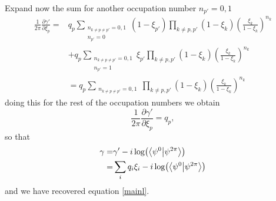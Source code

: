 \documentclass[twocolumn,amsmath,longbibliography,amssymb,superscriptaddress]{revtex4-1}
\begin{document}
Expand now the sum  for another occupation number $n_{p'} = 0,1$ 
\begin{align*}
\frac{1}{2\pi}\frac{\partial \gamma'}{\partial \xi_p} =& q_p\sum_{\substack{n_{k \neq p \neq p'}=0,1\\ n_{p'}= 0}} (1-\xi_{p'})\prod_{k\neq p,p'} (1-\xi_k)\left( \frac{\xi_k}{1-\xi_k} \right)^{n_k} \\
&+ q_p\sum_{\substack{n_{k \neq p \neq p'}=0,1\\ n_{p'}= 1}} \xi_{p'}\prod_{k\neq p,p'} (1-\xi_k)\left( \frac{\xi_k}{1-\xi_k} \right)^{n_k} \\
 &=q_p\sum_{\substack{n_{k \neq p \neq p'}=0,1}} \prod_{k\neq p,p'} (1-\xi_k)\left( \frac{\xi_k}{1-\xi_k} \right)^{n_k} 
\end{align*}
doing this for the rest of the occupation numbers we obtain 
\begin{equation}
\frac{1}{2\pi}\frac{\partial \gamma'}{\partial \xi_p} = q_p,
\end{equation}
so that 
\begin{align*}
\gamma =& \gamma' - i\log(\bra{\psi^0}\ket{\psi^{2\pi}})\\
=& \sum_{i}q_i \xi_i - i\log(\bra{\psi^0}\ket{\psi^{2\pi}})\\
\end{align*}
and we have recovered equation \ref{mainl}. 
\end{document}
